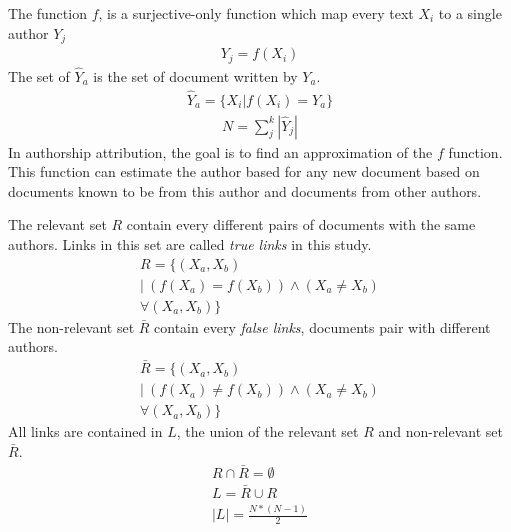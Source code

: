 \begin{definition}
  The function $f$, is a surjective-only function which map every text $X_i$ to a single author $Y_j$
  \begin{gather*}
    Y_j = f(X_i)
  \end{gather*}
  The set of $\hat{Y}_a$ is the set of document written by $Y_a$.
  \begin{gather*}
    \hat{Y}_a = \{X_i | f(X_i) = Y_a\}
  \end{gather*}
  \begin{gather*}
    N = \sum_{j}^k |\hat{Y}_j|
  \end{gather*}
  In authorship attribution, the goal is to find an approximation of the $f$ function. This function can estimate the author based for any new document based on documents known to be from this author and documents from other authors.
\end{definition}

\begin{definition}
  The relevant set $R$ contain every different pairs of documents with the same authors.
  Links in this set are called \textit{true links} in this study.
  \begin{gather*}
    R = \{(X_a, X_b)\ \\
    |\ \left( f(X_a) = f(X_b) \right) \land \left(X_a \neq X_b \right) \\
    \forall (X_a, X_b) \}
  \end{gather*}
  The non-relevant set $\bar{R}$ contain every \textit{false links}, documents pair with different authors.
  \begin{gather*}
    \bar{R} = \{(X_a, X_b)\ \\
    |\ \left( f(X_a) \neq f(X_b) \right) \land \left(X_a \neq X_b \right) \\
    \forall (X_a, X_b)\}
  \end{gather*}
  All links are contained in $L$, the union of the relevant set $R$ and non-relevant set $\bar{R}$.
  \begin{gather*}
    R \cap \bar{R} = \emptyset \\
    L = \bar{R} \cup R \\
    |L| = \frac{N * (N-1)}{2}
  \end{gather*}
\end{definition}

